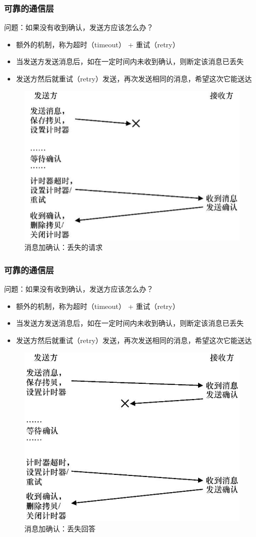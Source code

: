 \begin{frame}[fragile]
    \frametitle{可靠的通信层}
    问题：如果没有收到确认，发送方应该怎么办？\pause
    \begin{itemize}
        \item 额外的机制，称为超时（timeout） + 重试（retry）
        \item  当发送方发送消息后，如在一定时间内未收到确认，则断定该消息已丢失
        \item  发送方然后就重试（retry）发送，再次发送相同的消息，希望这次它能送达
    \end{itemize}

    \begin{figure}
        \includegraphics[width=0.4\linewidth]{figs/timeout.png}
          \caption{消息加确认：丢失的请求}
    \end{figure}
\end{frame}


\begin{frame}[fragile]
    \frametitle{可靠的通信层}
    问题：如果没有收到确认，发送方应该怎么办？\pause
    \begin{itemize}
        \item 额外的机制，称为超时（timeout） + 重试（retry）
        \item  当发送方发送消息后，如在一定时间内未收到确认，则断定该消息已丢失
        \item  发送方然后就重试（retry）发送，再次发送相同的消息，希望这次它能送达
    \end{itemize}
    
    \begin{figure}
        \includegraphics[width=0.35\linewidth]{figs/timeout-answer.png}
        \caption{消息加确认：丢失回答}
    \end{figure}
\end{frame}

